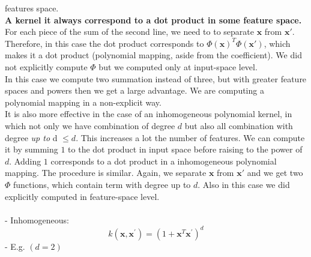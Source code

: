 features space.\\ \textbf{A kernel it always correspond to a dot product in some
feature space.} For each piece of the sum of the second line, we need to to
separate $\pmb{x}$ from $\pmb{x}'$. Therefore, in this case the dot product
corresponds to $\Phi(\pmb{x})^{T}\Phi(\pmb{x}')$, which makes it a dot product (polynomial
mapping, aside from the coefficient). We did not explicitly compute $\Phi$ but we
computed only at input-space level.\\ In this case we compute two summation instead
of three, but with greater feature spaces and powers then we get a large
advantage. We are computing a polynomial mapping in a non-explicit way.\\

It is also more effective in the case of an inhomogeneous polynomial kernel, in which
not only we have combination of degree $d$ but also all combination with degree\textit{
up to} d $\leq d$. This increases a lot the number of features. We can compute it
by summing $1$ to the dot product in input space before raising to the power of $d$.
Adding $1$ corresponds to a dot product in a inhomogeneous polynomial mapping. The
procedure is similar. Again, we separate $\pmb{x}$ from $\pmb{x}'$ and we get two
$\Phi$ functions, which contain term with degree up to $d$. Also in this case we
did explicitly computed in feature-space level. \\ \\ - Inhomogeneous:
\[
	k\left(\mathbf{x}, \mathbf{x}^{\prime}\right)=\left(1+\mathbf{x}^{T}\mathbf{x}^{\prime}
	\right)^{d}
\]
- E.g. $(d=2)$
